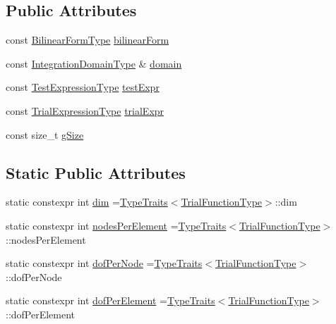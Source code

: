 \subsection*{Public Attributes}
\begin{DoxyCompactItemize}
\item 
const \hyperlink{structmodel_1_1_bilinear_weak_form_a13052aab9ae19efbffa3d881ceb184f9}{Bilinear\+Form\+Type} \hyperlink{structmodel_1_1_bilinear_weak_form_aa5ea33a6280c36cdb36beef41e7cc3f1}{bilinear\+Form}
\item 
const \hyperlink{structmodel_1_1_bilinear_weak_form_a537e7d0cf8fa78efb38cfe017e56196b}{Integration\+Domain\+Type} \& \hyperlink{structmodel_1_1_bilinear_weak_form_acc22ce08d028763977a7d0427f0117b3}{domain}
\item 
const \hyperlink{structmodel_1_1_bilinear_weak_form_acdfc10bd49650e2c484d222172834edd}{Test\+Expression\+Type} \hyperlink{structmodel_1_1_bilinear_weak_form_a98885bcd66d794307c7abfb3ce543838}{test\+Expr}
\item 
const \hyperlink{structmodel_1_1_bilinear_weak_form_a259b56acf743f646cc86607685f70791}{Trial\+Expression\+Type} \hyperlink{structmodel_1_1_bilinear_weak_form_a324cf51d42de687de79e445da265bab4}{trial\+Expr}
\item 
const size\+\_\+t \hyperlink{structmodel_1_1_bilinear_weak_form_a3c7dfa85132b98e728462f7cae7f87e0}{g\+Size}
\end{DoxyCompactItemize}
\subsection*{Static Public Attributes}
\begin{DoxyCompactItemize}
\item 
static constexpr int \hyperlink{structmodel_1_1_bilinear_weak_form_acd483ad54ba6cad041b458036f50154c}{dim} =\hyperlink{structmodel_1_1_type_traits}{Type\+Traits}$<$\hyperlink{structmodel_1_1_bilinear_weak_form_a3c646b6d23c1e5dc29480fc04b6c9587}{Trial\+Function\+Type}$>$\+::dim
\item 
static constexpr int \hyperlink{structmodel_1_1_bilinear_weak_form_a60eb39717dce6d992709e212544c3450}{nodes\+Per\+Element} =\hyperlink{structmodel_1_1_type_traits}{Type\+Traits}$<$\hyperlink{structmodel_1_1_bilinear_weak_form_a3c646b6d23c1e5dc29480fc04b6c9587}{Trial\+Function\+Type}$>$\+::nodes\+Per\+Element
\item 
static constexpr int \hyperlink{structmodel_1_1_bilinear_weak_form_a1033a799da488ed074d9c49c78bf83be}{dof\+Per\+Node} =\hyperlink{structmodel_1_1_type_traits}{Type\+Traits}$<$\hyperlink{structmodel_1_1_bilinear_weak_form_a3c646b6d23c1e5dc29480fc04b6c9587}{Trial\+Function\+Type}$>$\+::dof\+Per\+Node
\item 
static constexpr int \hyperlink{structmodel_1_1_bilinear_weak_form_a4897458848db3e0288687935e991b3e5}{dof\+Per\+Element} =\hyperlink{structmodel_1_1_type_traits}{Type\+Traits}$<$\hyperlink{structmodel_1_1_bilinear_weak_form_a3c646b6d23c1e5dc29480fc04b6c9587}{Trial\+Function\+Type}$>$\+::dof\+Per\+Element
\end{DoxyCompactItemize}


